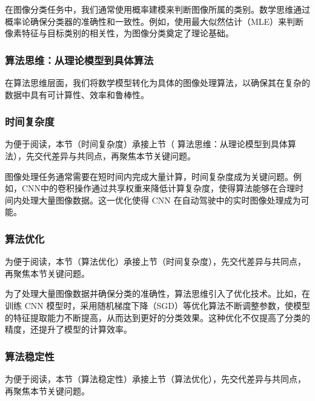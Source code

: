 在图像分类任务中，我们通常使用概率建模来判断图像所属的类别。数学思维通过概率论确保分类器的准确性和一致性。例如，使用最大似然估计（MLE）来判断像素特征与目标类别的相关性，为图像分类奠定了理论基础。
\subsubsection{ 算法思维：从理论模型到具体算法}



在算法思维层面，我们将数学模型转化为具体的图像处理算法，以确保其在复杂的数据中具有可计算性、效率和鲁棒性。
\subsubsection*{时间复杂度}


为便于阅读，本节（时间复杂度）承接上节（ 算法思维：从理论模型到具体算法），先交代差异与共同点，再聚焦本节关键问题。

图像处理任务通常需要在短时间内完成大量计算，时间复杂度成为关键问题。例如，CNN中的卷积操作通过共享权重来降低计算复杂度，使得算法能够在合理时间内处理大量图像数据。这一优化使得 CNN 在自动驾驶中的实时图像处理成为可能。
\subsubsection*{算法优化}


为便于阅读，本节（算法优化）承接上节（时间复杂度），先交代差异与共同点，再聚焦本节关键问题。

为了处理大量图像数据并确保分类的准确性，算法思维引入了优化技术。比如，在训练 CNN 模型时，采用随机梯度下降（SGD）等优化算法不断调整参数，使模型的特征提取能力不断提高，从而达到更好的分类效果。这种优化不仅提高了分类的精度，还提升了模型的计算效率。
\subsubsection*{算法稳定性}


为便于阅读，本节（算法稳定性）承接上节（算法优化），先交代差异与共同点，再聚焦本节关键问题。

